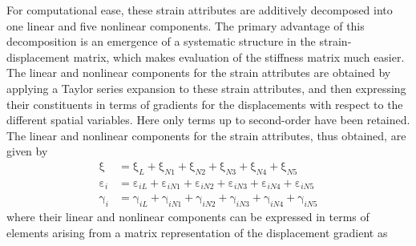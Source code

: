 For computational ease, these strain attributes are additively decomposed into one linear and five nonlinear components. The primary advantage of this decomposition is an emergence of a systematic structure in the strain-displacement matrix, which makes evaluation of the stiffness matrix much easier.  The linear and nonlinear components for the strain attributes are obtained by applying a Taylor series expansion to these strain attributes, and then expressing their constituents in terms of gradients for the displacements with respect to the different spatial variables.  Here only terms up to second-order have been retained. The linear and nonlinear components for the strain attributes, thus obtained, are given by
\begin{subequations}
    \begin{align}
    \mathrm  \xi & = \mathrm \xi_{L} + \mathrm  \xi_{N1} + \mathrm  \xi_{N2} + \mathrm  \xi_{N3} + \mathrm  \xi_{N4} + \mathrm  \xi_{N5}\\
    \mathrm  \varepsilon_{i} & = \mathrm  \varepsilon_{iL} + \mathrm  \varepsilon_{iN1} + \mathrm  \varepsilon_{iN2} + \mathrm  \varepsilon_{iN3} + \mathrm  \varepsilon_{iN4} + \mathrm  \varepsilon_{iN5} \\
    \mathrm \gamma_{i} & = \mathrm  \gamma_{iL} + \mathrm  \gamma_{iN1} + \mathrm  \gamma_{iN2} + \mathrm  \gamma_{iN3} + \mathrm  \gamma_{iN4} + \mathrm  \gamma_{iN5}
    \end{align}
    \label{totalvirtualstrain}
\end{subequations}
where their linear and nonlinear components can be expressed in terms of elements arising from a matrix representation of the displacement gradient as
